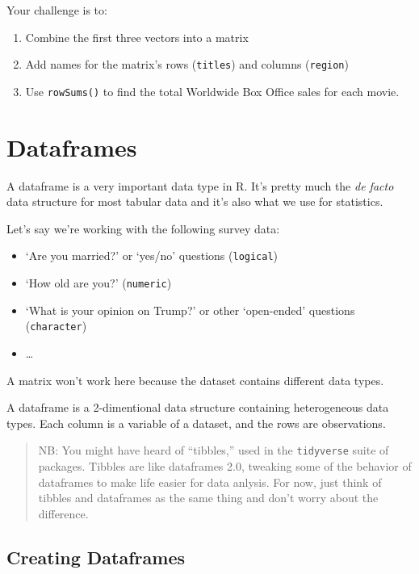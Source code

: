 \documentclass[]{book}
\providecommand{\tightlist}{%
  \setlength{\itemsep}{0pt}\setlength{\parskip}{0pt}}
\begin{document}
Your challenge is to:

\begin{enumerate}
\def\labelenumi{\arabic{enumi}.}
\tightlist
\item
  Combine the first three vectors into a matrix
\item
  Add names for the matrix's rows (\texttt{titles}) and columns
  (\texttt{region})
\item
  Use \texttt{rowSums()} to find the total Worldwide Box Office sales
  for each movie.
\end{enumerate}

\hypertarget{dataframes}{\section{Dataframes}\label{dataframes}}

A dataframe is a very important data type in R. It's pretty much the
\emph{de facto} data structure for most tabular data and it's also what
we use for statistics.

Let's say we're working with the following survey data:

\begin{itemize}
\tightlist
\item
  `Are you married?' or `yes/no' questions (\texttt{logical})
\item
  `How old are you?' (\texttt{numeric})
\item
  `What is your opinion on Trump?' or other `open-ended' questions
  (\texttt{character})
\item
  \ldots{}
\end{itemize}

A matrix won't work here because the dataset contains different data
types.

A dataframe is a 2-dimentional data structure containing heterogeneous
data types. Each column is a variable of a dataset, and the rows are
observations.

\begin{quote}
NB: You might have heard of ``tibbles,'' used in the \texttt{tidyverse}
suite of packages. Tibbles are like dataframes 2.0, tweaking some of the
behavior of dataframes to make life easier for data anlysis. For now,
just think of tibbles and dataframes as the same thing and don't worry
about the difference.
\end{quote}

\subsection{Creating Dataframes}\label{creating-dataframes}
\end{document}
